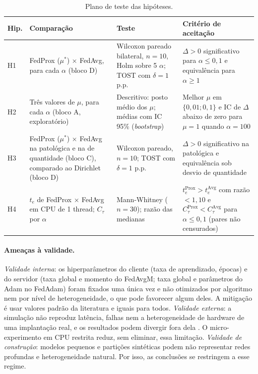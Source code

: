 \begin{table}[t]
    \centering\small
    \caption{Plano de teste das hipóteses.}
    \label{tab:hipoteses}
    \begin{tabular}{@{}p{1.1cm}p{4.6cm}p{3.6cm}p{6.2cm}@{}}
        \toprule
        Hip. & Comparação & Teste & Critério de aceitação \\
        \midrule
        H1 & FedProx ($\mu^*$) × FedAvg, para cada $\alpha$ (bloco D) & Wilcoxon pareado bilateral, $n = 10$, Holm sobre 5 $\alpha$; TOST com $\delta = 1$ p.p. & $\Delta > 0$ significativo para $\alpha \leq 0{,}1$ e equivalência para $\alpha \geq 1$ \\
        H2 & Três valores de $\mu$, para cada $\alpha$ (bloco A, exploratório) & Descritivo: posto médio dos $\mu$; médias com IC 95\% (\textit{bootstrap}) & Melhor $\mu$ em $\{0{,}01; 0{,}1\}$ e IC de $\Delta$ abaixo de zero para $\mu = 1$ quando $\alpha = 100$ \\
        H3 & FedProx ($\mu^*$) × FedAvg na patológica e na de quantidade (bloco C), comparado ao Dirichlet (bloco D) & Wilcoxon pareado, $n = 10$; TOST com $\delta = 1$ p.p. & $\Delta > 0$ significativo na patológica e equivalência sob desvio de quantidade \\
        H4 & $t_e$ de FedProx × FedAvg em CPU de 1 thread; $C_\tau$ por $\alpha$ & Mann-Whitney ($n = 30$); razão das medianas & $t_e^{\text{Prox}} > t_e^{\text{Avg}}$ com razão $< 1{,}10$ e $C_\tau^{\text{Prox}} < C_\tau^{\text{Avg}}$ para $\alpha \leq 0{,}1$ (pares não censurados) \\
        \bottomrule
    \end{tabular}
\end{table}

\paragraph{Ameaças à validade.} \textit{Validade interna}: os hiperparâmetros do cliente (taxa de aprendizado, épocas) e do servidor (taxa global e momento do FedAvgM; taxa global e parâmetros do Adam no FedAdam) foram fixados uma única vez e não otimizados por algoritmo nem por nível de heterogeneidade, o que pode favorecer algum deles. A mitigação é usar valores padrão da literatura e iguais para todos. \textit{Validade externa}: a simulação não reproduz latência, falhas nem a heterogeneidade de hardware de uma implantação real, e os resultados podem divergir fora dela \citep{valli2026beyond}. O micro-experimento em CPU restrita reduz, sem eliminar, essa limitação. \textit{Validade de construção}: modelos pequenos e partições sintéticas podem não representar redes profundas e heterogeneidade natural. Por isso, as conclusões se restringem a esse regime.

